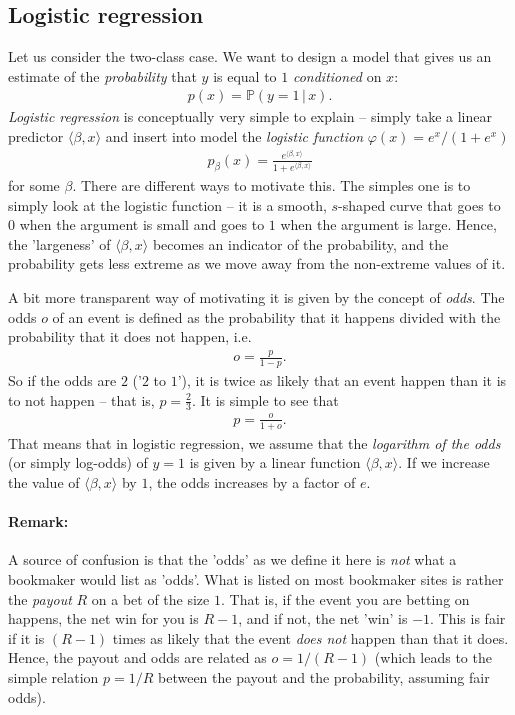 \documentclass{article}
\newcommand{\sprod}[1]{\langle #1 \rangle}
\begin{document}
\subsection{Logistic regression} Let us consider the two-class case. We want to design a model that gives us an estimate of the \emph{probability} that $y$ is equal to $1$ \emph{conditioned} on $x$:
\begin{align*}
    p(x) = \mathbb{P}(y=1 \, \vert \, x).
\end{align*}
\emph{Logistic regression} is conceptually very simple to explain -- simply take a linear predictor $\sprod{\beta,x}$ and insert into  model the \emph{logistic function} $\varphi(x)=e^x/(1+e^x)$
\begin{align*}
    p_\beta(x) = \frac{e^{\sprod{\beta,x}}}{1+e^{\sprod{\beta,x}}}
\end{align*}
for some $\beta$. There are different ways to motivate this. The simples one is to simply look at the logistic function -- it is a smooth, $s$-shaped curve that goes to $0$ when the argument is small and goes to $1$ when the argument is  large. Hence, the 'largeness' of $\sprod{\beta,x}$ becomes an indicator of the probability, and the probability gets less extreme as we move away from the non-extreme values of it.

A bit more transparent way of motivating it is given by the concept of \emph{odds}. The odds $o$ of an event is defined as the probability that it happens divided with the probability that it does not happen, i.e.
\begin{align*}
    o = \frac{p}{1-p}.
\end{align*}
So if the odds are $2$ ('$2$ to $1$'), it is twice as likely that an event happen than it is to not happen -- that is, $p=\tfrac{2}{3}$. It is simple to see that 
\begin{align*}
    p = \frac{o}{1+o}.
\end{align*}
That means that in logistic regression, we assume that the \emph{logarithm of the odds} (or simply log-odds) of $y=1$ is given by a linear function $\sprod{\beta,x}$. If we increase the value of $\sprod{\beta,x}$ by $1$, the odds increases by a factor of $e$.

\paragraph{Remark:} A source of confusion is that the 'odds' as we define it here is \emph{not} what a bookmaker would list as 'odds'. What is listed on most bookmaker sites is rather the \emph{payout} $R$ on a bet of the size $1$. That is, if the event you are betting on happens, the net win for you is $R-1$, and if not, the net 'win' is $-1$. This is fair if it is $(R-1)$ times as likely that the event \emph{does not} happen than that it does. Hence, the payout and odds are related as $o=1/(R-1)$ (which leads to the simple relation $p=1/R$ between the payout and the probability, assuming fair odds).
\end{document}
